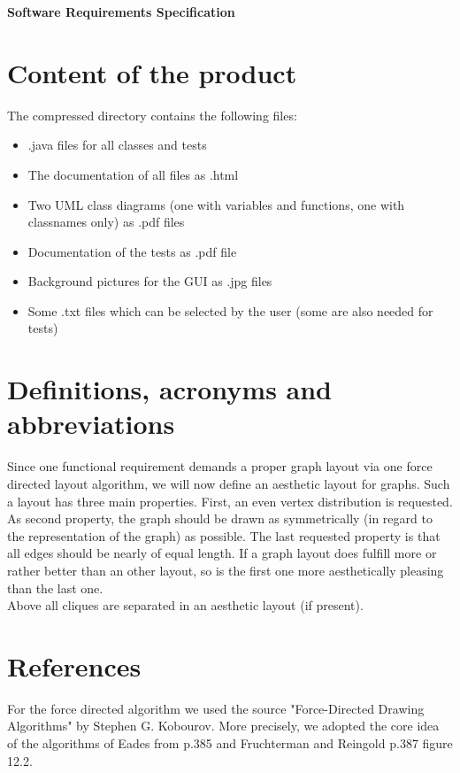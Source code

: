 \documentclass{article}
\begin{document}
\begin{center}
	\textbf{\Huge{Software Requirements Specification}}
\end{center}
\section{Content of the product}
The compressed directory contains the following files:
\begin{itemize}
\item .java files for all classes and tests
\item The documentation of all files as .html
\item Two UML class diagrams (one with variables and functions, one with classnames only) as .pdf files
\item Documentation of the tests as .pdf file
\item Background pictures for the GUI as .jpg files
\item Some .txt files which can be selected by the user (some are also needed for tests)
\end{itemize}


\section{Definitions, acronyms and abbreviations}
Since one functional requirement demands a proper graph layout via one force directed layout algorithm, we will now define an aesthetic layout for graphs. Such a layout has three main properties. First, an even vertex distribution is requested. As second property, the graph should be drawn as symmetrically (in regard to the representation of the graph) as possible. The last requested property is that all edges should be nearly of equal length. If a graph layout does fulfill more or rather better than an other layout, so is the first one more aesthetically pleasing than the last one. \\
Above all cliques are separated in an aesthetic layout (if present). 

\section{References}
For the force directed algorithm we used the source "Force-Directed Drawing Algorithms" by Stephen G. Kobourov. More precisely, we adopted the core idea of the algorithms of Eades from p.385 and Fruchterman and Reingold p.387 figure 12.2.
\end{document}
